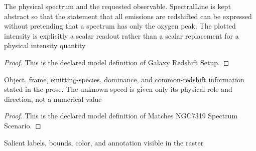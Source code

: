 \begin{definition}
  \label{def:physics:phyx-mini-0596:phyxminiproblems-problemphyxmini0596-galaxyredshiftsetup}
  The physical spectrum and the requested observable. SpectralLine is kept abstract so that the statement that all emissions are redshifted can be expressed without pretending that a spectrum has only the oxygen peak. The plotted intensity is explicitly a scalar readout rather than a scalar replacement for a physical intensity quantity
\end{definition}
\begin{proof}
  This is the declared model definition of Galaxy Redshift Setup.
\end{proof}
\begin{definition}
  \label{def:physics:phyx-mini-0596:phyxminiproblems-problemphyxmini0596-matchesngc7319spectrumscenario}
  Object, frame, emitting-species, dominance, and common-redshift information stated in the prose. The unknown speed is given only its physical role and direction, not a numerical value
\end{definition}
\begin{proof}
  This is the declared model definition of Matches NGC7319 Spectrum Scenario.
\end{proof}
\begin{definition}
  \label{def:physics:phyx-mini-0596:phyxminiproblems-problemphyxmini0596-matchesprimaryspectrumfigure}
  Salient labels, bounds, color, and annotation visible in the raster
\end{definition}

